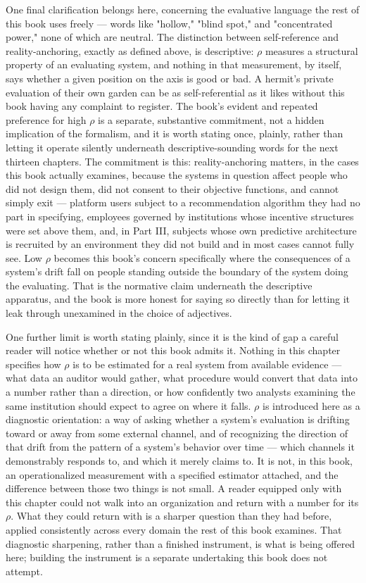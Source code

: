 \documentclass[12pt,a4paper]{book}
\begin{document}
One final clarification belongs here, concerning the evaluative language the rest of this book uses freely — words like "hollow," "blind spot," and "concentrated power," none of which are neutral. The distinction between self-reference and reality-anchoring, exactly as defined above, is descriptive: $\rho$ measures a structural property of an evaluating system, and nothing in that measurement, by itself, says whether a given position on the axis is good or bad. A hermit's private evaluation of their own garden can be as self-referential as it likes without this book having any complaint to register. The book's evident and repeated preference for high $\rho$ is a separate, substantive commitment, not a hidden implication of the formalism, and it is worth stating once, plainly, rather than letting it operate silently underneath descriptive-sounding words for the next thirteen chapters. The commitment is this: reality-anchoring matters, in the cases this book actually examines, because the systems in question affect people who did not design them, did not consent to their objective functions, and cannot simply exit — platform users subject to a recommendation algorithm they had no part in specifying, employees governed by institutions whose incentive structures were set above them, and, in Part III, subjects whose own predictive architecture is recruited by an environment they did not build and in most cases cannot fully see. Low $\rho$ becomes this book's concern specifically where the consequences of a system's drift fall on people standing outside the boundary of the system doing the evaluating. That is the normative claim underneath the descriptive apparatus, and the book is more honest for saying so directly than for letting it leak through unexamined in the choice of adjectives.

One further limit is worth stating plainly, since it is the kind of gap a careful reader will notice whether or not this book admits it. Nothing in this chapter specifies how $\rho$ is to be estimated for a real system from available evidence — what data an auditor would gather, what procedure would convert that data into a number rather than a direction, or how confidently two analysts examining the same institution should expect to agree on where it falls. $\rho$ is introduced here as a diagnostic orientation: a way of asking whether a system's evaluation is drifting toward or away from some external channel, and of recognizing the direction of that drift from the pattern of a system's behavior over time — which channels it demonstrably responds to, and which it merely claims to. It is not, in this book, an operationalized measurement with a specified estimator attached, and the difference between those two things is not small. A reader equipped only with this chapter could not walk into an organization and return with a number for its $\rho$. What they could return with is a sharper question than they had before, applied consistently across every domain the rest of this book examines. That diagnostic sharpening, rather than a finished instrument, is what is being offered here; building the instrument is a separate undertaking this book does not attempt.
\end{document}
